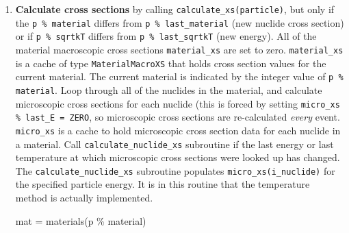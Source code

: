 \documentclass[10pt]{article}
\numberwithin{equation}{section} %
\begin{document}
\begin{enumerate}
\begin{enumerate}
\begin{enumerate}
		\item {\bf Calculate cross sections} by calling {\tt calculate\_xs(particle)}, but only if the {\tt p \% material} differs from {\tt p \% last\_material} (new nuclide cross section) or if {\tt p \% sqrtkT} differs from {\tt p \% last\_sqrtkT} (new energy). All of the material macroscopic cross sections {\tt material\_xs} are set to zero. {\tt material\_xs} is a cache of type {\tt MaterialMacroXS} that holds cross section values for the current material. The current material is indicated by the integer value of {\tt p \% material}. Loop through all of the nuclides in the material, and calculate microscopic cross sections for each nuclide (this is forced by setting {\tt micro\_xs \% last\_E = ZERO}, so microscopic cross sections are re-calculated {\it every} event. {\tt micro\_xs} is a cache to hold microscopic cross section data for each nuclide in a material. Call {\tt calculate\_nuclide\_xs} subroutine if the last energy or last temperature at which microscopic cross sections were looked up has changed. The {\tt calculate\_nuclide\_xs} subroutine populates {\tt micro\_xs(i\_nuclide)} for the specified particle energy. It is in this routine that the temperature method is actually implemented. 
		
				\begin{algorithm}[H]
				\;
				mat = materials(p \% material)\;
				\;
				\end{algorithm}
		

\end{enumerate}
\end{enumerate}
\end{enumerate}
\end{document}
